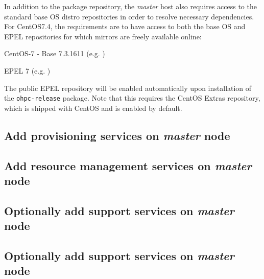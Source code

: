 \documentclass[letterpaper]{article}
\newcommand{\baseOS}{CentOS7.4}
\begin{document}
In addition to the \OHPC{} package repository, the {\em master} host also
requires access to the standard base OS distro repositories in order to resolve
necessary dependencies. For \baseOS{}, the requirements are to have access to
both the base OS and EPEL repositories for which mirrors are freely available online:

\begin{itemize*}
\item CentOS-7 - Base 7.3.1611
  (e.g. \href{http://mirror.centos.org/centos-7/7/os/x86\_64}
             {\color{blue}{http://mirror.centos.org/centos-7/7/os/x86\_64}} )
\item EPEL 7 (e.g. \href{http://download.fedoraproject.org/pub/epel/7/x86\_64}
                        {\color{blue}{http://download.fedoraproject.org/pub/epel/7/x86\_64}} )
\end{itemize*}

\noindent The public EPEL repository will be enabled automatically upon installation of the 
\texttt{ohpc-release} package. Note that this requires the CentOS Extras
repository, which is shipped with CentOS and is enabled by default.




\subsection{Add provisioning services on {\em master} node} \label{sec:add_provisioning}




\subsection{Add resource management services on {\em master} node} \label{sec:add_rm}


\subsection{Optionally add \InfiniBand{} support services on {\em master} node} \label{sec:add_ofed}


\subsection{Optionally add \OmniPath{} support services on {\em master} node} \label{sec:add_opa}

\end{document}

